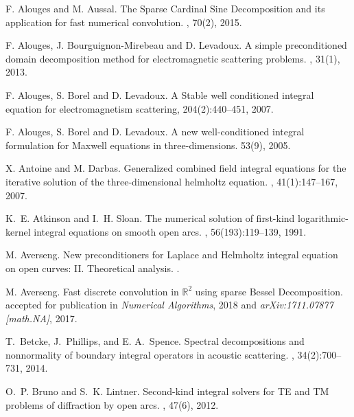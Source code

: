 \documentclass[a4paper]{article}
\begin{document}
\begin{thebibliography}{10}

F. Alouges and M. Aussal. \newblock The Sparse Cardinal Sine Decomposition and its application for fast numerical convolution. , 70(2), 2015.

F. Alouges, J. Bourguignon-Mirebeau and D. Levadoux. 
\newblock A simple preconditioned domain decomposition method for electromagnetic scattering problems. , 31(1), 2013.

F. Alouges, S. Borel and D. Levadoux. 
\newblock A Stable well conditioned integral equation for electromagnetism scattering,  204(2):440--451, 2007.

F. Alouges, S. Borel and D. Levadoux.
\newblock  A new well-conditioned integral formulation for Maxwell equations in three-dimensions. 
 53(9), 2005.

X. Antoine and M. Darbas.
\newblock Generalized combined field integral equations for the iterative
  solution of the three-dimensional helmholtz equation.
,
  41(1):147--167, 2007.

K.~E. Atkinson and I.~H. Sloan.
\newblock The numerical solution of first-kind logarithmic-kernel integral
  equations on smooth open arcs.
, 56(193):119--139, 1991.

M. Averseng.
\newblock New preconditioners for Laplace and  Helmholtz integral equation on open curves: II. Theoretical analysis.
.

M. Averseng. 
\newblock Fast discrete convolution in $\mathbb{R}^2$ using sparse Bessel Decomposition.
\newblock accepted for publication in {\em Numerical Algorithms}, 2018 and {\em arXiv:1711.07877 [math.NA]}, 2017.

T.~Betcke, J.~Phillips, and E. A.~Spence.
\newblock Spectral decompositions and nonnormality of boundary integral
  operators in acoustic scattering.
, 34(2):700--731, 2014.

O.~P. Bruno and S.~K. Lintner.
\newblock Second-kind integral solvers for TE and TM problems of diffraction by
  open arcs.
, 47(6), 2012.


\end{thebibliography}
\end{document}
